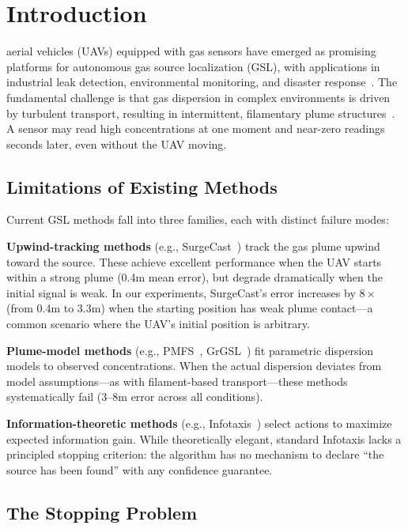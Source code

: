 \section{Introduction}
\label{sec:intro}

 aerial vehicles (UAVs) equipped with gas sensors have emerged as promising platforms for autonomous gas source localization (GSL), with applications in industrial leak detection, environmental monitoring, and disaster response~\cite{ref1,ref2}. The fundamental challenge is that gas dispersion in complex environments is driven by turbulent transport, resulting in intermittent, filamentary plume structures~\cite{ref3,ref4}. A sensor may read high concentrations at one moment and near-zero readings seconds later, even without the UAV moving.

\subsection{Limitations of Existing Methods}

Current GSL methods fall into three families, each with distinct failure modes:

\textbf{Upwind-tracking methods} (e.g., SurgeCast~\cite{ref5}) track the gas plume upwind toward the source. These achieve excellent performance when the UAV starts within a strong plume (0.4m mean error), but degrade dramatically when the initial signal is weak. In our experiments, SurgeCast's error increases by $8\times$ (from 0.4m to 3.3m) when the starting position has weak plume contact---a common scenario where the UAV's initial position is arbitrary.

\textbf{Plume-model methods} (e.g., PMFS~\cite{ref6}, GrGSL~\cite{ref7}) fit parametric dispersion models to observed concentrations. When the actual dispersion deviates from model assumptions---as with filament-based transport---these methods systematically fail (3--8m error across all conditions).

\textbf{Information-theoretic methods} (e.g., Infotaxis~\cite{ref8}) select actions to maximize expected information gain. While theoretically elegant, standard Infotaxis lacks a principled stopping criterion: the algorithm has no mechanism to declare ``the source has been found'' with any confidence guarantee.

\subsection{The Stopping Problem}

